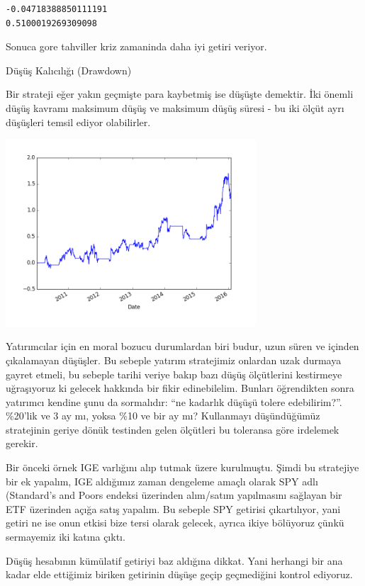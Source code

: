 \documentclass[12pt,fleqn]{article}\usepackage{../../common}
\begin{document}
\begin{verbatim}
-0.04718388850111191
0.5100019269309098
\end{verbatim}

Sonuca gore tahviller kriz zamaninda daha iyi getiri veriyor.

Düşüş Kalıcılığı (Drawdown)

Bir strateji eğer yakın geçmişte para kaybetmiş ise düşüşte demektir. İki
önemli düşüş kavramı maksimum düşüş ve maksimum düşüş süresi - bu iki ölçüt
ayrı düşüşleri temsil ediyor olabilirler.

\includegraphics[height=7cm]{tser_back_02.png}

Yatırımcılar için en moral bozucu durumlardan biri budur, uzun süren ve
içinden çıkalamayan düşüşler. Bu sebeple yatırım stratejimiz onlardan
uzak durmaya gayret etmeli, bu sebeple tarihi veriye bakıp bazı düşüş
ölçütlerini kestirmeye uğraşıyoruz ki gelecek hakkında bir fikir
edinebilelim. Bunları öğrendikten sonra yatırımcı kendine şunu da
sormalıdır: ``ne kadarlık düşüşü tolere edebilirim?''. \%20'lik ve 3 ay mı,
yoksa \%10 ve bir ay mı?  Kullanmayı düşündüğümüz stratejinin geriye dönük
testinden gelen ölçütleri bu toleransa göre irdelemek gerekir.

Bir önceki örnek IGE varlığını alıp tutmak üzere kurulmuştu. Şimdi bu
stratejiye bir ek yapalım, IGE aldığımız zaman dengeleme amaçlı olarak SPY
adlı (Standard's and Poors endeksi üzerinden alım/satım yapılmasını
sağlayan bir ETF üzerinden açığa satış yapalım. Bu sebeple SPY getirisi
çıkartılıyor, yani getiri ne ise onun etkisi bize tersi olarak gelecek,
ayrıca ikiye bölüyoruz çünkü sermayemiz iki katına çıktı.

Düşüş hesabının kümülatif getiriyi baz aldığına dikkat. Yani herhangi bir
ana kadar elde ettiğimiz biriken getirinin düşüşe geçip geçmediğini kontrol
ediyoruz.
\end{document}

